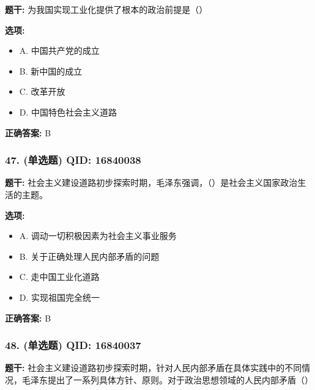 \documentclass[12pt,UTF8]{ctexart}
\begin{document}
\textbf{题干:}
为我国实现工业化提供了根本的政治前提是（）

\textbf{选项:}
\begin{itemize}[leftmargin=*]

  \item A. 中国共产党的成立

  \item B. 新中国的成立

  \item C. 改革开放

  \item D. 中国特色社会主义道路

\end{itemize}

\textbf{正确答案:}
B

\vspace{0.3em}\hrulefill\vspace{0.7em}

\subsubsection*{47. (单选题) \small QID: 16840038}

\textbf{题干:}
社会主义建设道路初步探索时期，毛泽东强调，（）是社会主义国家政治生活的主题。

\textbf{选项:}
\begin{itemize}[leftmargin=*]

  \item A. 调动一切积极因素为社会主义事业服务

  \item B. 关于正确处理人民内部矛盾的问题

  \item C. 走中国工业化道路

  \item D. 实现祖国完全统一

\end{itemize}

\textbf{正确答案:}
B

\vspace{0.3em}\hrulefill\vspace{0.7em}

\subsubsection*{48. (单选题) \small QID: 16840037}

\textbf{题干:}
社会主义建设道路初步探索时期，针对人民内部矛盾在具体实践中的不同情况，毛泽东提出了一系列具体方针、原则。对于政治思想领域的人民内部矛盾（）
\end{document}
